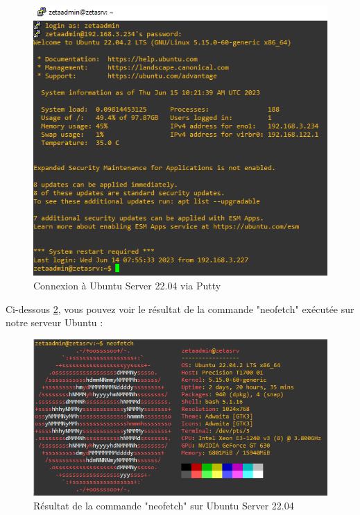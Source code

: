\begin{figure}[H]
 \centering
    \includegraphics[width=15cm]{Images/zetaserver.png}
    \caption{Connexion à Ubuntu Server 22.04 via Putty}
    \label{fig:putty-connection}
\end{figure}

Ci-dessous \ref{fig:neofetch-result}, vous pouvez voir le résultat de la commande "neofetch" exécutée sur notre serveur Ubuntu : \\

\begin{figure}[H]
 \centering
    \includegraphics[width=15cm]{Images/neofetchzetasrv.png}
    \caption{Résultat de la commande "neofetch" sur Ubuntu Server 22.04}
    \label{fig:neofetch-result}
\end{figure}



